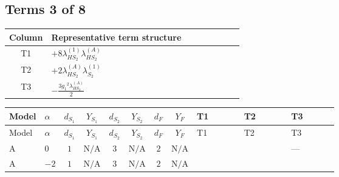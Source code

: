\documentclass[8pt]{article}
\begin{document}
\begin{landscape}
\subsection*{Terms 3 of 8}
\begin{center}
\begin{tabular}{@{}c >{\raggedright\arraybackslash}p{0.82\linewidth}@{}}
\toprule
Column & Representative term structure \\
\midrule
T1 & \(\displaystyle +8 {\lambda_{HS_2}^{(1)}} {\lambda_{HS_2}^{(A)}}\) \\
\midrule
T2 & \(\displaystyle +2 {\lambda_{HS_2}^{(A)}} {\lambda_{S_2}^{(1)}}\) \\
\midrule
T3 & \(\displaystyle -\frac{3 {g_1}^2 {\lambda_{HS_2}^{(A)}}}{2}\) \\
\midrule
\bottomrule
\end{tabular}
\end{center}
\smallskip
\tiny
\begin{longtable}{@{}llcccccc >{\raggedright\arraybackslash}p{0.21\linewidth} >{\raggedright\arraybackslash}p{0.21\linewidth} >{\raggedright\arraybackslash}p{0.21\linewidth}@{}}
\toprule
Model & $\alpha$ & $d_{S_1}$ & $Y_{S_1}$ & $d_{S_2}$ & $Y_{S_2}$ & $d_F$ & $Y_F$ & T1 & T2 & T3 \\
\midrule
\endfirsthead
\toprule
Model & $\alpha$ & $d_{S_1}$ & $Y_{S_1}$ & $d_{S_2}$ & $Y_{S_2}$ & $d_F$ & $Y_F$ & T1 & T2 & T3 \\
\midrule
\endhead
A & $0$ & $1$ & $\text{N/A}$ & $3$ & $\text{N/A}$ & $2$ & $\text{N/A}$ & \scriptsize\adjustbox{max width=\linewidth}{$\begin{gathered} +8 {\lambda_{HS_2}^{(1)}} {\lambda_{HS_2}^{(A)}}\end{gathered}$} & \scriptsize\adjustbox{max width=\linewidth}{$\begin{gathered} +2 {\lambda_{HS_2}^{(A)}} {\lambda_{S_2}^{(1)}}\end{gathered}$} & --- \\
\midrule
A & $-2$ & $1$ & $\text{N/A}$ & $3$ & $\text{N/A}$ & $2$ & $\text{N/A}$ & \scriptsize\adjustbox{max width=\linewidth}{$\begin{gathered} +8 {\lambda_{HS_2}^{(1)}} {\lambda_{HS_2}^{(A)}}\end{gathered}$} & \scriptsize\adjustbox{max width=\linewidth}{$\begin{gathered} +2 {\lambda_{HS_2}^{(A)}} {\lambda_{S_2}^{(1)}}\end{gathered}$} & \scriptsize\adjustbox{max width=\linewidth}{$\begin{gathered} -\frac{3 {g_1}^2 {\lambda_{HS_2}^{(A)}}}{2}\end{gathered}$} \\

\end{longtable}
\end{landscape}
\end{document}
